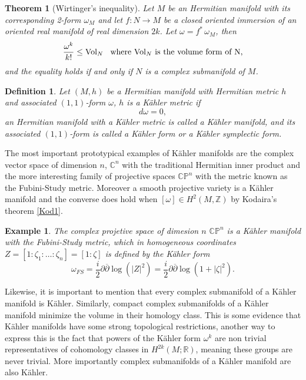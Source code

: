 \documentclass[12pt,twoside,a4paper]{report}
\newtheorem{definition}{Definition}[section]
\newtheorem{theorem}{Theorem}[section]
\newtheorem{example}{Example}
\newcommand{\zah}{\ensuremath{ \mathbb Z }}
\newcommand{\re}{\ensuremath{\mathbb R }}
\newcommand{\con}{\ensuremath{\mathbb{C}^n}}
\newcommand{\cp}{\ensuremath{\mathbb{CP}}}
\begin{document}
\begin{theorem}[Wirtinger's inequality]
        Let $M$ be an Hermitian manifold with its corresponding 2-form $\omega_M$ and let $f:N\rightarrow M$ be a closed oriented immersion of an oriented real manifold of real dimension $2k$. Let $\omega=f^*\,\omega_M$, then
        \begin{equation}
                        \frac{\omega^k}{k!}\leq \textrm{Vol}_N\hspace{0.3cm}\text{where }\textrm{Vol}_N\text{ is the volume form of N,}
        \end{equation}
        and the equality holds if and only if $N$ is a complex submanifold of $M$.
\end{theorem}
\begin{definition}
        Let $(M,h)$ be a Hermitian manifold with Hermitian metric $h$ and associated $(1,1)$-form $\omega$, $h$ is a Kähler metric if
        \[
          d\omega=0,
        \]
        \noindent an Hermitian manifold with a Kähler metric is called a \textit{Kähler manifold}, and its associated $(1,1)$-form is  called a \textit{Kähler form} or a \textit{Kähler symplectic form}.
\end{definition}

The most important prototypical examples of K\"ahler manifolds are the complex vector space of dimension $n$, $\con$ with the traditional Hermitian inner product and the more interesting family of projective spaces $\cp^{n}$ with the metric known as the Fubini-Study metric. Moreover a smooth projective variety is a Kähler manifold and the converse does hold when $[\omega]\in H^{2}(M,\zah)$ by Kodaira's theorem \ref{Kod1}.

\begin{example}
  The complex projetive space of dimesion $n$ $\cp^{n}$ is a Kähler manifold with the Fubini-Study metric, which in homogeneous coordinates $Z=[1:\zeta_{1}:\dots:\zeta_{n}]=[1:\zeta]$ is defined by the Kähler form
  \[
    \omega_{FS}=\frac{i}{2}\partial \overline{\partial}\log(|Z|^{2})=\frac{i}{2}\partial \overline{\partial}\log(1+|\zeta|^{2}).
  \]
\end{example}

Likewise, it is important to mention that every complex submanifold of a K\"ahler manifold is K\"ahler. Similarly, compact complex submanifolds of a K\"ahler manifold minimize the volume in their homology class. This is some evidence that Kähler manifolds have some strong topological restrictions, another way to express this is the fact that powers of the Kähler form $\omega^k$ are non trivial representatives of cohomology classes in $H^{2k}(M ;\re)$, meaning these groups are never trivial. More importantly complex submanifolds of a Kähler manifold are also K\"ahler.
\end{document}
